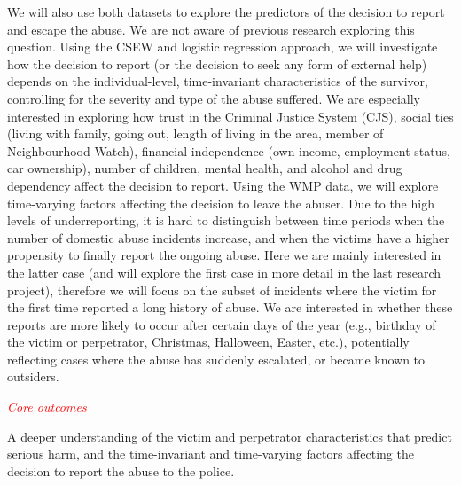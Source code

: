 \documentclass[11pt, a4paper]{article}
\begin{document}
We will also use both datasets to explore the predictors of the decision to report and escape the abuse. We are not aware of previous research exploring this question. Using the CSEW and logistic regression approach, we will investigate how the decision to report (or the decision to seek any form of external help) depends on the individual-level, time-invariant characteristics of the survivor, controlling for the severity and type of the abuse suffered. We are especially interested in exploring how trust in the Criminal Justice System (CJS), social ties (living with family, going out, length of living in the area, member of Neighbourhood Watch), financial independence (own income, employment status, car ownership), number of children, mental health, and alcohol and drug dependency affect the decision to report. Using the WMP data, we will explore time-varying factors affecting the decision to leave the abuser. Due to the high levels of underreporting, it is hard to distinguish between time periods when the number of domestic abuse incidents increase, and when the victims have a higher propensity to finally report the ongoing abuse. Here we are mainly interested in the latter case (and will explore the first case in more detail in the last research project), therefore we will focus on the subset of incidents where the victim for the first time reported a long history of abuse. We are interested in whether these reports are more likely to occur after certain days of the year (e.g., birthday of the victim or perpetrator, Christmas, Halloween, Easter, etc.), potentially reflecting cases where the abuse has suddenly escalated, or became known to outsiders.



\textcolor{red}{\textit{Core outcomes}}

A deeper understanding of the victim and perpetrator characteristics that predict serious harm, and the time-invariant and time-varying factors affecting the decision to report the abuse to the police. 




\end{document}
